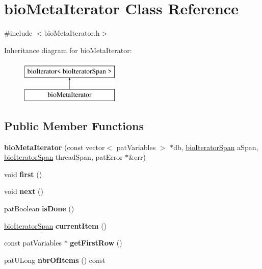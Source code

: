 \hypertarget{classbio_meta_iterator}{}\section{bio\+Meta\+Iterator Class Reference}
\label{classbio_meta_iterator}


{\ttfamily \#include $<$bio\+Meta\+Iterator.\+h$>$}

Inheritance diagram for bio\+Meta\+Iterator\+:\begin{figure}[H]
\begin{center}
\leavevmode
\includegraphics[height=2.000000cm]{classbio_meta_iterator}
\end{center}
\end{figure}
\subsection*{Public Member Functions}
\begin{DoxyCompactItemize}
\item 
\mbox{\label{classbio_meta_iterator_a0a0645b4dcf67a67bc0393f5ee2930ab}} 
{\bfseries bio\+Meta\+Iterator} (const vector$<$ pat\+Variables $>$ $\ast$db, \hyperlink{classbio_iterator_span}{bio\+Iterator\+Span} a\+Span, \hyperlink{classbio_iterator_span}{bio\+Iterator\+Span} thread\+Span, pat\+Error $\ast$\&err)
\item 
\mbox{\label{classbio_meta_iterator_a9a7811e6802aa923d096e0d066a2f99e}} 
void {\bfseries first} ()
\item 
\mbox{\label{classbio_meta_iterator_a8ed0bb09d817f4cbd9db082bd8cf150f}} 
void {\bfseries next} ()
\item 
\mbox{\label{classbio_meta_iterator_afd2898952789ca75659b761ca4643e11}} 
pat\+Boolean {\bfseries is\+Done} ()
\item 
\mbox{\label{classbio_meta_iterator_af127fffb01500d0dd9cee87e923e256e}} 
\hyperlink{classbio_iterator_span}{bio\+Iterator\+Span} {\bfseries current\+Item} ()
\item 
\mbox{\label{classbio_meta_iterator_a6c49281dcd8940ca54c658351e7b9302}} 
const pat\+Variables $\ast$ {\bfseries get\+First\+Row} ()
\item 
\mbox{\label{classbio_meta_iterator_a55efa0ba7f8167da7d2ade63c84e670d}} 
pat\+U\+Long {\bfseries nbr\+Of\+Items} () const
\end{DoxyCompactItemize}


